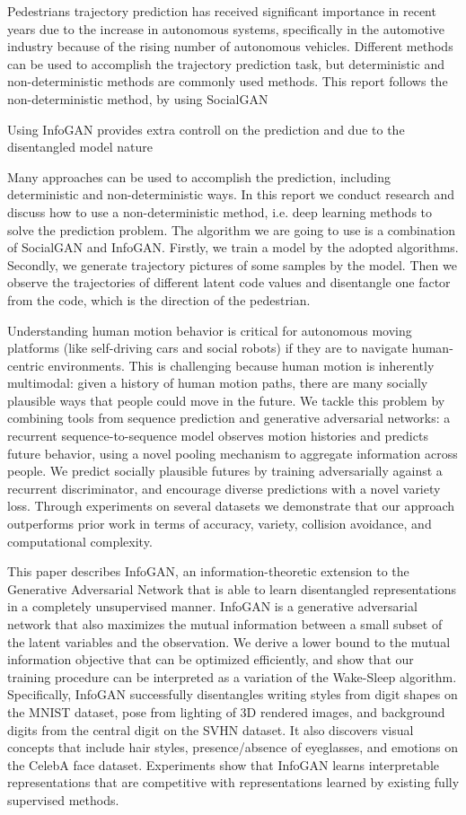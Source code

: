 Pedestrians trajectory prediction has received significant importance in recent years due to the increase in autonomous systems, specifically in the automotive industry because of the rising number of autonomous vehicles. Different methods can be used to accomplish the trajectory prediction task, but deterministic and non-deterministic methods are commonly used methods. This report follows the non-deterministic method, by using SocialGAN 

Using InfoGAN provides extra controll on the prediction and due to the disentangled model nature 


Many approaches can be used to accomplish the prediction, including deterministic and non-deterministic ways. In this report we conduct research and discuss how to use a non-deterministic method, i.e. deep learning methods to solve the prediction problem. The algorithm we are going to use is a combination of SocialGAN and InfoGAN. Firstly, we train a model by the adopted algorithms. Secondly, we generate trajectory pictures of some samples by the model. Then we observe the trajectories of different latent code values and disentangle one factor from the code, which is the direction of the pedestrian.



Understanding human motion behavior is critical for autonomous moving platforms (like self-driving cars and social robots) if they are to navigate human-centric environments. This is challenging because human motion is inherently multimodal: given a history of human motion paths,
there are many socially plausible ways that people could
move in the future. We tackle this problem by combining
tools from sequence prediction and generative adversarial networks: a recurrent sequence-to-sequence model observes motion histories and predicts future behavior, using
a novel pooling mechanism to aggregate information across
people. We predict socially plausible futures by training adversarially against a recurrent discriminator, and encourage diverse predictions with a novel variety loss. Through
experiments on several datasets we demonstrate that our
approach outperforms prior work in terms of accuracy, variety, collision avoidance, and computational complexity.

This paper describes InfoGAN, an information-theoretic extension to the Generative Adversarial Network that is able to learn disentangled representations in a completely unsupervised manner. InfoGAN is a generative adversarial network that also maximizes the mutual information between a small subset of the latent variables and the observation. We derive a lower bound to the mutual information objective that can be optimized efficiently, and show that our training procedure can be interpreted as a variation of the Wake-Sleep algorithm. Specifically, InfoGAN successfully disentangles writing styles from digit shapes on the MNIST dataset, pose from lighting of 3D rendered images, and background digits from the central digit on the SVHN dataset. It also discovers visual concepts that include hair styles, presence/absence of eyeglasses, and emotions on the CelebA face dataset. Experiments show that InfoGAN learns interpretable representations that are competitive with representations learned by existing fully supervised methods.